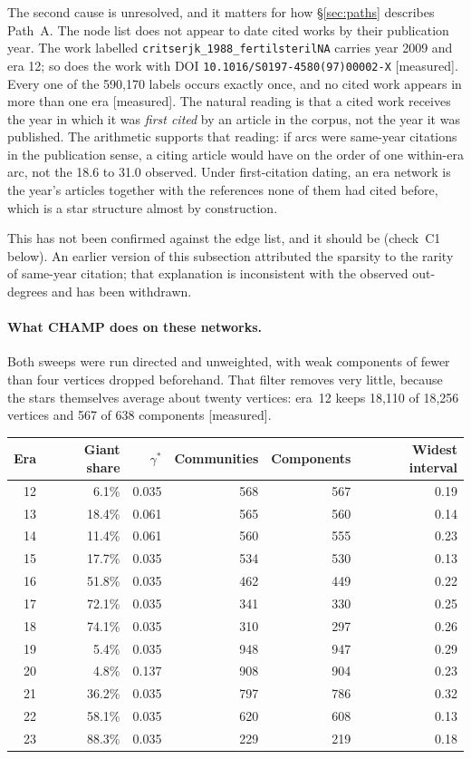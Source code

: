 \documentclass[11pt]{article}
\newcommand{\meas}{{\footnotesize\textsf{[measured]}}}
\newcommand{\code}[1]{\texttt{\small #1}}
\begin{document}
The second cause is unresolved, and it matters for how \S\ref{sec:paths} describes Path~A.
The node list does not appear to date cited works by their publication year. The work
labelled \code{critserjk\_1988\_fertilsterilNA} carries year 2009 and era 12; so does the work
with DOI \code{10.1016/S0197-4580(97)00002-X} \meas{}. Every one of the 590{,}170 labels
occurs exactly once, and no cited work appears in more than one era \meas{}. The natural
reading is that a cited work receives the year in which it was \emph{first cited} by an
article in the corpus, not the year it was published. The arithmetic supports that reading:
if arcs were same-year citations in the publication sense, a citing article would have on the
order of one within-era arc, not the 18.6 to 31.0 observed. Under first-citation dating, an
era network is the year's articles together with the references none of them had cited before,
which is a star structure almost by construction.

This has not been confirmed against the edge list, and it should be (check~C1 below). An
earlier version of this subsection attributed the sparsity to the rarity of same-year
citation; that explanation is inconsistent with the observed out-degrees and has been
withdrawn.

\paragraph{What CHAMP does on these networks.} Both sweeps were run directed and unweighted,
with weak components of fewer than four vertices dropped beforehand. That filter removes very
little, because the stars themselves average about twenty vertices: era~12 keeps 18{,}110 of
18{,}256 vertices and 567 of 638 components \meas{}.

\begin{center}
\small
\begin{tabular}{rrrrrr}
\toprule
Era & Giant share & $\gamma^{*}$ & Communities & Components & Widest interval \\
\midrule
12 & 6.1\%  & 0.035 & 568 & 567 & 0.19 \\
13 & 18.4\% & 0.061 & 565 & 560 & 0.14 \\
14 & 11.4\% & 0.061 & 560 & 555 & 0.23 \\
15 & 17.7\% & 0.035 & 534 & 530 & 0.13 \\
16 & 51.8\% & 0.035 & 462 & 449 & 0.22 \\
17 & 72.1\% & 0.035 & 341 & 330 & 0.25 \\
18 & 74.1\% & 0.035 & 310 & 297 & 0.26 \\
19 & 5.4\%  & 0.035 & 948 & 947 & 0.29 \\
20 & 4.8\%  & 0.137 & 908 & 904 & 0.23 \\
21 & 36.2\% & 0.035 & 797 & 786 & 0.32 \\
22 & 58.1\% & 0.035 & 620 & 608 & 0.13 \\
23 & 88.3\% & 0.035 & 229 & 219 & 0.18 \\
\bottomrule
\end{tabular}
\end{center}
\end{document}
